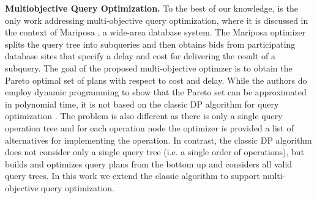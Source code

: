 \textbf{Multiobjective Query Optimization.} To the best of our
knowledge, \cite{papadimitriou_multiobjective_2001} is the only work
addressing multi-objective query optimization, where it is discussed
in the context of Mariposa \cite{stonebraker_mariposa:_1996}, a
wide-area database system. The Mariposa optimizer splits the query
tree into subqueries and then obtains bids from participating database
sites that specify a delay and cost for delivering the result of a
subquery. The goal of the proposed multi-objective optimzer
\cite{papadimitriou_multiobjective_2001} is to obtain the Pareto
optimal set of plans with respect to cost and delay. While the authors
do employ dynamic programming to show that the Pareto set can be
approximated in polynomial time, it is not based on the classic DP
algorithm for query optimization \cite{selinger_access_1979}. The
problem is also different as there is only a single query operation
tree and for each operation node the optimizer is provided a list of
alternatives for implementing the operation. In contrast, the classic
DP algorithm \cite{selinger_access_1979} does not consider only a
single query tree (i.e. a single order of operations), but builds and
optimizes query plans from the bottom up and considers all valid query
trees. In this work we extend the classic algorithm to support
multi-objective query optimization.












